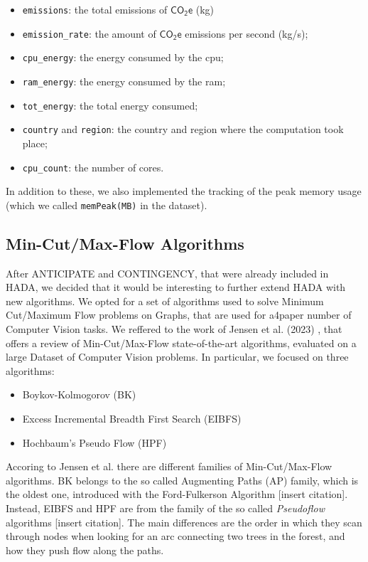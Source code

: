 \documentclass[a4paper,singleside,12pt]{report} %
\begin{document}
\begin{itemize}
    \item \verb|emissions|: the total emissions of $\mathsf{CO_2e}$ (kg)
    \item \verb|emission_rate|: the amount of $\mathsf{CO_2e}$ emissions per second (kg/s);
    \item \verb|cpu_energy|: the energy consumed by the cpu;
    \item \verb|ram_energy|: the energy consumed by the ram;
    \item \verb|tot_energy|: the total energy consumed;
    \item \verb|country| and \verb|region|: the country and region where the computation took place;
    \item \verb|cpu_count|: the number of cores.
\end{itemize}

In addition to these, we also implemented the tracking of the peak memory usage (which we called \verb|memPeak(MB)| in the dataset).

\subsection{Min-Cut/Max-Flow Algorithms}

After ANTICIPATE and CONTINGENCY, that were already included in HADA, we decided that it would be interesting to further extend HADA
with new algorithms. We opted for a set of algorithms used to solve Minimum Cut/Maximum Flow problems on Graphs, that are used for a4paper
number of Computer Vision tasks. We reffered to the work of Jensen et al. (2023) \cite{Jensen2023Maxflow}, that offers a review of 
Min-Cut/Max-Flow state-of-the-art algorithms, evaluated on a large Dataset of Computer Vision problems. In particular, we focused on
three algorithms:

\begin{itemize}
\item Boykov-Kolmogorov (BK)
\item Excess Incremental Breadth First Search (EIBFS)
\item Hochbaum's Pseudo Flow (HPF)
\end{itemize}

Accoring to Jensen et al. there are different families of Min-Cut/Max-Flow algorithms. BK belongs to the so called Augmenting Paths (AP)
family, which is the oldest one, introduced with the Ford-Fulkerson Algorithm [insert citation]. Instead, EIBFS and HPF are from the family of the so 
called \textit{Pseudoflow} algorithms [insert citation]. The main differences are the order in which they scan through nodes when looking for an arc 
connecting two trees in the forest, and how they push flow along the paths.
\end{document}
